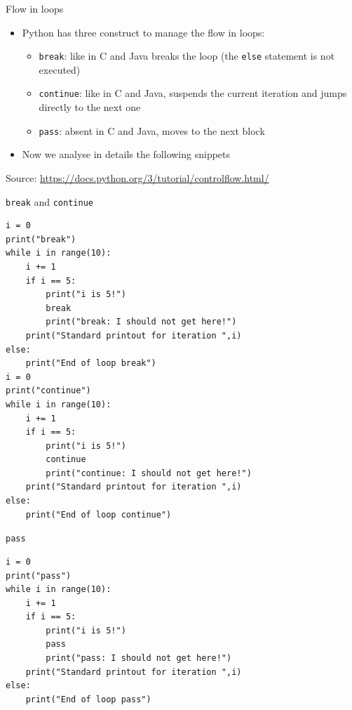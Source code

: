 \documentclass{beamer}
\begin{document}
\begin{frame}[fragile]
{\centerline{Flow in loops}}
\begin{itemize}
    \item Python has three construct to manage the flow in loops:
\begin{itemize}
    \item \texttt{break}:  like in C and Java breaks the loop (the \texttt{else} statement is not executed)
    \item \texttt{continue}: like in C and Java, suspends the current iteration and jumps directly to the next one
    \item \texttt{pass}: absent in C and Java, moves to the next block
        \end{itemize}
        \item Now we analyse in details the following snippets
    \end{itemize}

\begin{center}
\tiny Source: \url{https://docs.python.org/3/tutorial/controlflow.html/}
\end{center}

\end{frame}

\begin{frame}[fragile]
{\centerline{\texttt{break} and \texttt{continue}}}
\begin{lstlisting}[style=myPythonStyle]
i = 0
print("break")
while i in range(10):
    i += 1
    if i == 5:
        print("i is 5!")
        break
        print("break: I should not get here!")
    print("Standard printout for iteration ",i)
else:
    print("End of loop break")
i = 0
print("continue")
while i in range(10):
    i += 1
    if i == 5:
        print("i is 5!")
        continue
        print("continue: I should not get here!")
    print("Standard printout for iteration ",i)
else:
    print("End of loop continue")
\end{lstlisting}
\end{frame}


\begin{frame}[fragile]
{\centerline{\texttt{pass}}}
\begin{lstlisting}[style=myPythonStyle]
i = 0
print("pass")
while i in range(10):
    i += 1
    if i == 5:
        print("i is 5!")
        pass
        print("pass: I should not get here!")
    print("Standard printout for iteration ",i)
else:
    print("End of loop pass")
\end{lstlisting}

\end{frame}
\end{document}
